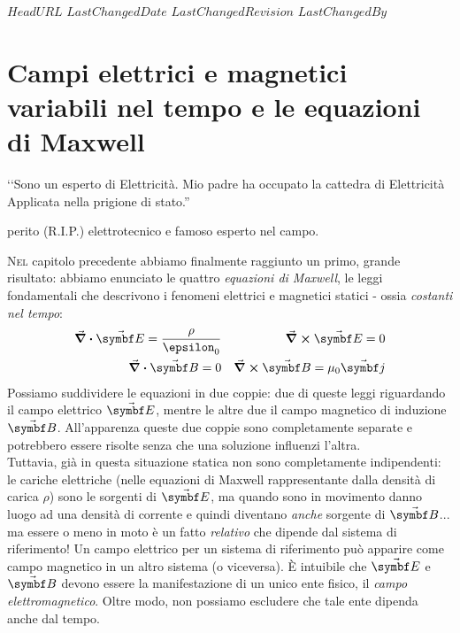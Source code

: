 \svnidlong
{$HeadURL$}
{$LastChangedDate$}
{$LastChangedRevision$}
{$LastChangedBy$}
\chapter{Campi elettrici e magnetici variabili nel tempo e le equazioni di Maxwell}

\begin{introduction}
	‘‘Sono un esperto di Elettricità. Mio padre ha occupato la cattedra di Elettricità Applicata nella	prigione di stato.''
	\begin{flushright}
		 perito (R.I.P.) elettrotecnico e famoso esperto nel campo.
	\end{flushright}
\end{introduction}
\lettrine[findent=1pt, nindent=0pt]{N}{el} capitolo precedente abbiamo finalmente raggiunto un primo, grande risultato: abbiamo enunciato le quattro \textit{equazioni di Maxwell}, le leggi fondamentali che descrivono i fenomeni elettrici e magnetici statici - ossia \textit{costanti nel tempo}:
\begin{align*}
	\div{\vba{E}}=\frac{\rho}{\epsilon_0}&&\curl{\vba{E}}=0\\
	\div{\vba{B}}=0&&\curl{\vba{B}}=\mu_0\vba{j}
\end{align*}
Possiamo suddividere le equazioni in due coppie: due di queste leggi riguardando il campo elettrico $\vba{E}$, mentre le altre due il campo magnetico di induzione $\vba{B}$. All'apparenza queste due coppie sono completamente separate e potrebbero essere risolte senza che una soluzione influenzi l'altra.\\
Tuttavia, già in questa situazione statica non sono completamente indipendenti: le cariche elettriche (nelle equazioni di Maxwell rappresentante dalla densità di carica $\rho$) sono le sorgenti di $\vba{E}$, ma quando sono in movimento danno luogo ad una densità di corrente e quindi diventano \textit{anche} sorgente di $\vba{B}$... ma essere o meno in moto è un fatto \textit{relativo} che dipende dal sistema di riferimento! Un campo elettrico per un sistema di riferimento può apparire come campo magnetico in un altro sistema (o viceversa). È intuibile che $\vba{E}$ e $\vba{B}$ devono essere la manifestazione di un unico ente fisico, il \textit{campo elettromagnetico}. Oltre modo, non possiamo escludere che tale ente dipenda anche dal tempo.\\
